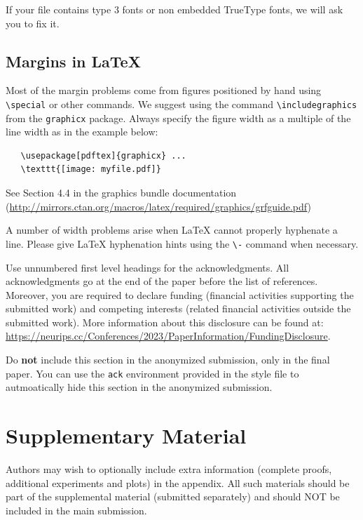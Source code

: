 \documentclass{article}
\begin{document}
\begin{CJK}{UTF8}{gbsn}
\begin{itemize}
\end{itemize}


If your file contains type 3 fonts or non embedded TrueType fonts, we will ask
you to fix it.


\subsection{Margins in \LaTeX{}}


Most of the margin problems come from figures positioned by hand using
\verb+\special+ or other commands. We suggest using the command
\verb+\includegraphics+ from the \verb+graphicx+ package. Always specify the
figure width as a multiple of the line width as in the example below:
\begin{verbatim}
   \usepackage[pdftex]{graphicx} ...
   \texttt{[image: myfile.pdf]}
\end{verbatim}
See Section 4.4 in the graphics bundle documentation
(\url{http://mirrors.ctan.org/macros/latex/required/graphics/grfguide.pdf})


A number of width problems arise when \LaTeX{} cannot properly hyphenate a
line. Please give LaTeX hyphenation hints using the \verb+\-+ command when
necessary.


\begin{ack}
Use unnumbered first level headings for the acknowledgments. All acknowledgments
go at the end of the paper before the list of references. Moreover, you are required to declare
funding (financial activities supporting the submitted work) and competing interests (related financial activities outside the submitted work).
More information about this disclosure can be found at: \url{https://neurips.cc/Conferences/2023/PaperInformation/FundingDisclosure}.


Do {\bf not} include this section in the anonymized submission, only in the final paper. You can use the \texttt{ack} environment provided in the style file to autmoatically hide this section in the anonymized submission.
\end{ack}



\section{Supplementary Material}

Authors may wish to optionally include extra information (complete proofs, additional experiments and plots) in the appendix. All such materials should be part of the supplemental material (submitted separately) and should NOT be included in the main submission.



\end{CJK}
\end{document}
